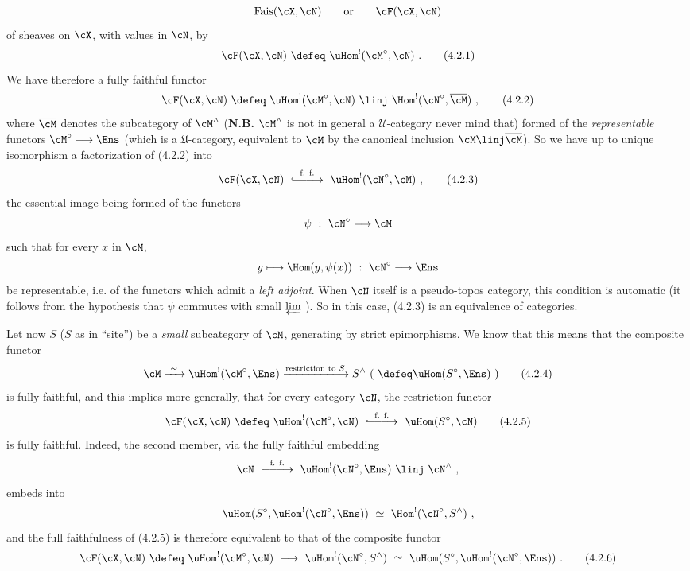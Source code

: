 \[
\mathrm{Fais}(\cX,\cN) \qquad \text{or} \qquad \cF(\cX,\cN)
\]
of sheaves on $\cX$, with values in $\cN$, by
\[
\cF(\cX,\cN) \ \defeq\ \uHom^{!}(\cM^{\circ},\cN) \ .
\tag*{(4.2.1)}
\]
We have therefore a fully faithful functor
\[
\cF(\cX,\cN) \ \defeq\ \uHom^{!}(\cM^{\circ},\cN) \ \linj\ \Hom^{!}(\cN^{\circ},\overline{\cM}) \ ,
\tag*{(4.2.2)}
\]
where $\overline{\cM}$ denotes the subcategory of $\cM^{\wedge}$ (\textbf{N.B.} $\cM^{\wedge}$ is not in general a $\mathcal{U}$-category never mind that) formed of the \textit{representable} functors $\cM^{\circ}\longrightarrow\Ens$ (which is a $\mathfrak{U}$-category, equivalent to $\cM$ by the canonical inclusion $\cM \linj \overline{\cM}$). So we have up to unique isomorphism a factorization of (4.2.2) into
\[
\cF(\cX,\cN) \ \overset{\text{f. f.}}{\lhook\joinrel\relbar\joinrel\relbar\joinrel\longrightarrow}\ \uHom^{!}(\cN^{\circ},\cM) \ ,
\tag*{(4.2.3)}
\]
the essential image being formed of the functors
\[
\psi \ :\ \cN^{\circ} \longrightarrow \cM
\]
such that for every $x$ in $\cM$,
\[
y \longmapsto \Hom(y,\psi(x)) \ :\ \cN^{\circ} \longrightarrow \Ens
\]
be representable, i.e. of the functors which
admit a \textit{left adjoint}. When $\cN$ itself is a pseudo-topos category, this condition is automatic (it follows from the hypothesis that $\psi$ commutes with small $\varprojlim$ ). So in this case, (4.2.3) is an equivalence of categories.

Let now $S$ ($S$ as in ``site'') be a \textit{small} subcategory of $\cM$, generating by strict epimorphisms. We know that this means that the composite functor
\[
\cM \xrightarrow{\ \sim\ } \uHom^{!}(\cM^{\circ},\Ens) \xrightarrow{\text{restriction to } S} S^{\wedge} \ (\ \defeq \uHom(S^{\circ},\Ens)\ )
\tag*{(4.2.4)}
\]
is fully faithful, and this implies more generally, that for every category $\cN$, the restriction functor
\[
\cF(\cX,\cN) \ \defeq\ \uHom^{!}(\cM^{\circ},\cN) \ \overset{\text{f. f.}}{\lhook\joinrel\relbar\joinrel\relbar\joinrel\longrightarrow}\ \uHom(S^{\circ},\cN)
\tag*{(4.2.5)}
\]
is fully faithful. Indeed, the second member, via the fully faithful embedding
\[
\cN \ \overset{\text{f. f.}}{\lhook\joinrel\relbar\joinrel\relbar\joinrel\longrightarrow}\ \uHom^{!}(\cN^{\circ},\Ens) \ \linj\ \cN^{\wedge} \ ,
\]
embeds into
\[
\uHom(S^{\circ},\uHom^{!}(\cN^{\circ},\Ens)) \ \simeq\ \Hom^{!}(\cN^{\circ},S^{\wedge}) \ ,
\]
and the full faithfulness of (4.2.5) is therefore equivalent to that of the composite functor
\[
\cF(\cX,\cN) \ \defeq\ \uHom^{!}(\cM^{\circ},\cN) \ \longrightarrow\ \uHom^{!}(\cN^{\circ},S^{\wedge}) \ \simeq\ \uHom(S^{\circ},\uHom^{!}(\cN^{\circ},\Ens)) \ .
\tag*{(4.2.6)}
\]

